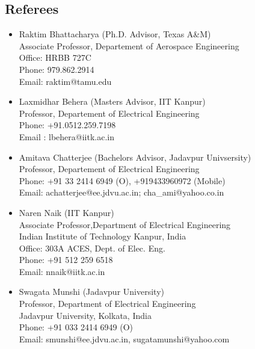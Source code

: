 \documentclass[margin,line]{resume}
\begin{document}
\begin{resume}
    \section{\mysidestyle Referees}
    \begin{itemize}
        \item Raktim Bhattacharya (Ph.D. Advisor, Texas A\&M)\\
        Associate  Professor, Departement of Aerospace Engineering\\
        Office: HRBB 727C\\ 
        Phone: 979.862.2914\\
        Email: raktim@tamu.edu
        \item Laxmidhar Behera (Masters Advisor, IIT Kanpur)\\
        Professor, Departement of Electrical Engineering\\
        Phone: +91.0512.259.7198\\
        Email : lbehera@iitk.ac.in
        \item Amitava Chatterjee (Bachelors Advisor, Jadavpur Univsersity)\\
        Professor, Departement of Electrical Engineering\\
        Phone:   +91 33 2414 6949 (O), +919433960972 (Mobile)\\
        Email: achatterjee@ee.jdvu.ac.in; cha\_ami@yahoo.co.in
        \item Naren Naik (IIT Kanpur)\\
        Associate Professor,Department of Electrical Engineering\\
        Indian Institute of Technology Kanpur, India\\
        Office: 303A ACES, Dept. of Elec. Eng.\\
        Phone: +91 512 259 6518 \\
        Email: nnaik@iitk.ac.in
        \item Swagata Munshi (Jadavpur University)\\
        Professor, Department of Electrical Engineering\\	
        Jadavpur University, Kolkata, India\\
        Phone: +91 033 2414 6949 (O)\\
        Email: smunshi@ee.jdvu.ac.in, sugatamunshi@yahoo.com
    \end{itemize}

\end{resume}
\end{document}
